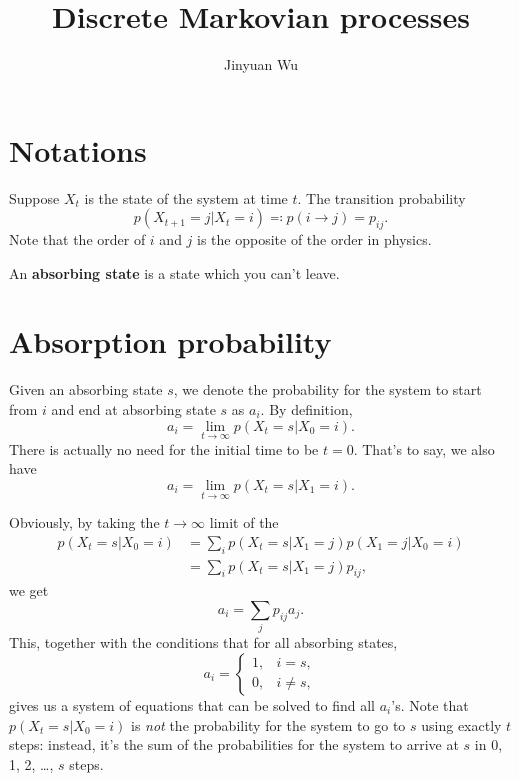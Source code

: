 \documentclass[hyperref, a4paper]{article}
\title{Discrete Markovian processes}
\author{Jinyuan Wu}
\newcommand*{\concept}[1]{{\textbf{#1}}}
\begin{document}
\maketitle

\section{Notations}

Suppose $X_t$ is the state of the system at time $t$.
The transition probability 
\begin{equation}
    p(X_{t+1} = j | X_{t} = i) \eqqcolon p(i \to j) = p_{ij}.
\end{equation}
Note that the order of $i$ and $j$ is the opposite of the order in physics.

An \concept{absorbing state} is a state which you can't leave.

\section{Absorption probability}

Given an absorbing state $s$,
we denote the probability for the system to start from $i$ and end at absorbing state $s$ as $a_i$.
By definition,
\begin{equation}
    a_i = \lim_{t \to \infty} p(X_t = s | X_0 = i).
\end{equation}
There is actually no need for the initial time to be $t = 0$.
That's to say, we also have 
\begin{equation}
    a_i = \lim_{t \to \infty} p(X_t = s | X_1 = i).
\end{equation}

Obviously, by taking the $t \to \infty$ limit of the 
\[
    \begin{aligned}
        p(X_{t} = s | X_0 = i) &=  \sum_i p(X_t = s | X_1 = j) p(X_1 = j | X_0 = i) \\
        &= \sum_i p(X_t = s | X_1 = j)  p_{ij},
    \end{aligned}
\]
we get 
\begin{equation}
    a_i = \sum_{j} p_{ij} a_j.
\end{equation}
This, together with the conditions that for all absorbing states,
\begin{equation}
    a_i = \begin{cases}
        1, & i = s, \\
        0, & i \neq s,
    \end{cases}
\end{equation}
gives us a system of equations that can be solved to find all $a_i$'s.
Note that $p(X_t = s | X_0 = i)$ is \emph{not} the probability for the system to go to $s$ using exactly $t$ steps:
instead, it's the sum of the probabilities for the system to arrive at $s$ in 0, 1, 2, \dots, $s$ steps.
\end{document}
